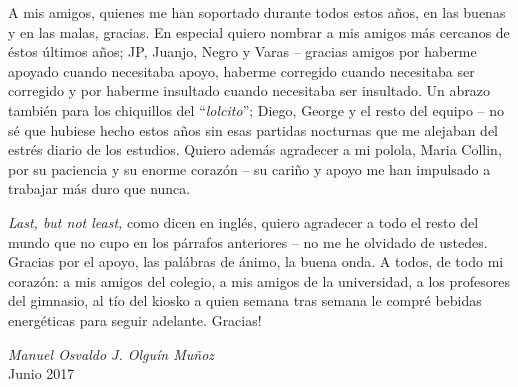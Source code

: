 \begin{thanks}
    A mis amigos, quienes me han soportado durante todos estos años, en las buenas y en las malas, gracias. 
    En especial quiero nombrar a mis amigos más cercanos de éstos últimos años; JP, Juanjo, Negro y Varas -- gracias amigos por haberme apoyado cuando necesitaba apoyo, haberme corregido cuando necesitaba ser corregido y por haberme insultado cuando necesitaba ser insultado. 
    Un abrazo también para los chiquillos del ``\emph{lolcito}''; Diego, George y el resto del equipo -- no sé que hubiese hecho estos años sin esas partidas nocturnas que me alejaban del estrés diario de los estudios. 
    Quiero además agradecer a mi polola, Maria Collin, por su paciencia y su enorme corazón -- su cariño y apoyo me han impulsado a trabajar más duro que nunca.
    
    \emph{Last, but not least,} como dicen en inglés, quiero agradecer a todo el resto del mundo que no cupo en los párrafos anteriores -- no me he olvidado de ustedes. 
    Gracias por el apoyo, las palábras de ánimo, la buena onda. 
    A todos, de todo mi corazón: a mis amigos del colegio, a mis amigos de la universidad, a los profesores del gimnasio, al tío del kiosko a quien semana tras semana le compré bebidas energéticas para seguir adelante. 
    Gracias!\\
    
    \begin{flushright}
        \textit{Manuel Osvaldo J. Olguín Muñoz}\\
        Junio 2017
    \end{flushright}
\end{thanks}